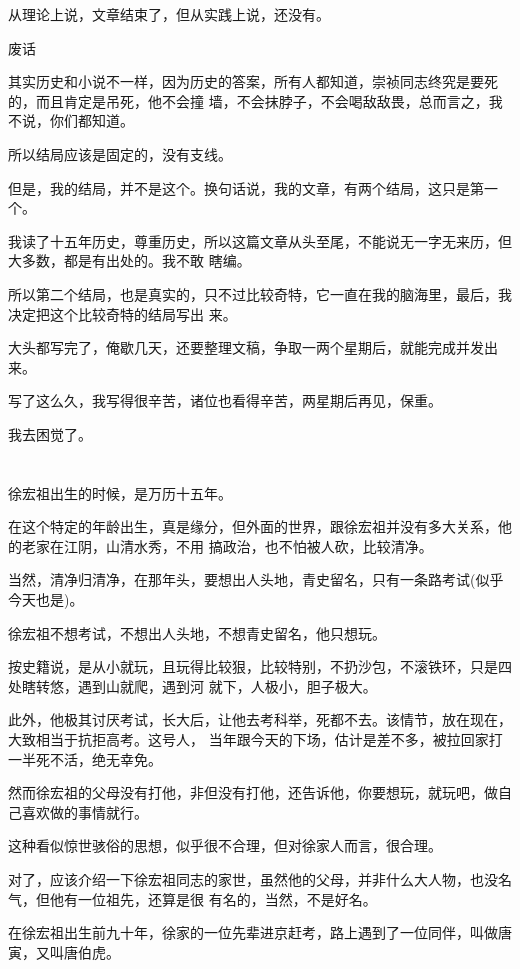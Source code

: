 \documentclass[11pt,a4paper,onecolumn]{article}
\begin{document}
从理论上说，文章结束了，但从实践上说，还没有。

废话

其实历史和小说不一样，因为历史的答案，所有人都知道，崇祯同志终究是要死的，而且肯定是吊死，他不会撞
墙，不会抹脖子，不会喝敌敌畏，总而言之，我不说，你们都知道。

所以结局应该是固定的，没有支线。

但是，我的结局，并不是这个。换句话说，我的文章，有两个结局，这只是第一个。

我读了十五年历史，尊重历史，所以这篇文章从头至尾，不能说无一字无来历，但大多数，都是有出处的。我不敢
瞎编。

所以第二个结局，也是真实的，只不过比较奇特，它一直在我的脑海里，最后，我决定把这个比较奇特的结局写出
来。

大头都写完了，俺歇几天，还要整理文稿，争取一两个星期后，就能完成并发出来。

写了这么久，我写得很辛苦，诸位也看得辛苦，两星期后再见，保重。

我去困觉了。

\section[\thesection]{}

徐宏祖出生的时候，是万历十五年。

在这个特定的年龄出生，真是缘分，但外面的世界，跟徐宏祖并没有多大关系，他的老家在江阴，山清水秀，不用
搞政治，也不怕被人砍，比较清净。

当然，清净归清净，在那年头，要想出人头地，青史留名，只有一条路\myrule 考试(似乎今天也是)。

徐宏祖不想考试，不想出人头地，不想青史留名，他只想玩。

按史籍说，是从小就玩，且玩得比较狠，比较特别，不扔沙包，不滚铁环，只是四处瞎转悠，遇到山就爬，遇到河
就下，人极小，胆子极大。

此外，他极其讨厌考试，长大后，让他去考科举，死都不去。该情节，放在现在，大致相当于抗拒高考。这号人，
当年跟今天的下场，估计是差不多，被拉回家打一半死不活，绝无幸免。

然而徐宏祖的父母没有打他，非但没有打他，还告诉他，你要想玩，就玩吧，做自己喜欢做的事情就行。

这种看似惊世骇俗的思想，似乎很不合理，但对徐家人而言，很合理。

对了，应该介绍一下徐宏祖同志的家世，虽然他的父母，并非什么大人物，也没名气，但他有一位祖先，还算是很
有名的，当然，不是好名。

在徐宏祖出生前九十年，徐家的一位先辈进京赶考，路上遇到了一位同伴，叫做唐寅，又叫唐伯虎。
\end{document}
